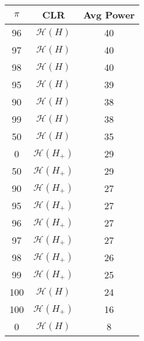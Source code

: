\centering \begin{tabular}{c|c|c}
$\pi$	&CLR	&Avg Power\\\hline
96	&$\mathcal{H}(H)$	&40\\
97	&$\mathcal{H}(H)$	&40\\
98	&$\mathcal{H}(H)$	&40\\
95	&$\mathcal{H}(H)$	&39\\
90	&$\mathcal{H}(H)$	&38\\
99	&$\mathcal{H}(H)$	&38\\
50	&$\mathcal{H}(H)$	&35\\
0	&$\mathcal{H}(H_+)$	&29\\
50	&$\mathcal{H}(H_+)$	&29\\
90	&$\mathcal{H}(H_+)$	&27\\
95	&$\mathcal{H}(H_+)$	&27\\
96	&$\mathcal{H}(H_+)$	&27\\
97	&$\mathcal{H}(H_+)$	&27\\
98	&$\mathcal{H}(H_+)$	&26\\
99	&$\mathcal{H}(H_+)$	&25\\
100	&$\mathcal{H}(H)$	&24\\
100	&$\mathcal{H}(H_+)$	&16\\
0	&$\mathcal{H}(H)$	&8\\
\end{tabular}
